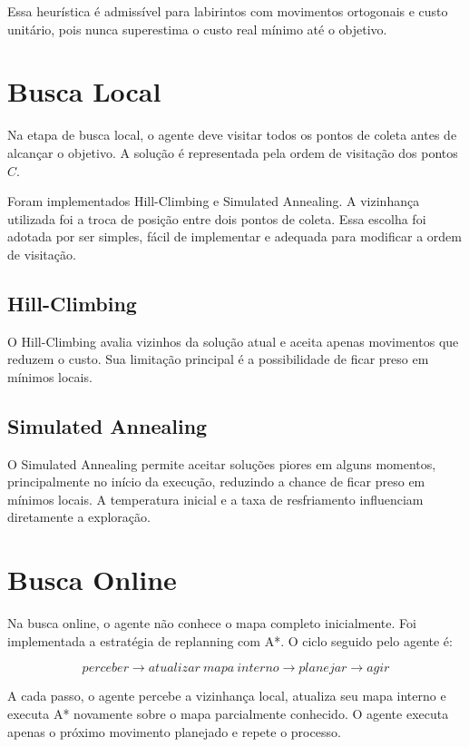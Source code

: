 \documentclass[12pt,a4paper]{article}
\begin{document}
Essa heurística é admissível para labirintos com movimentos ortogonais e custo unitário, pois nunca superestima o custo real mínimo até o objetivo.

\section{Busca Local}

Na etapa de busca local, o agente deve visitar todos os pontos de coleta antes de alcançar o objetivo. A solução é representada pela ordem de visitação dos pontos $C$.

Foram implementados Hill-Climbing e Simulated Annealing. A vizinhança utilizada foi a troca de posição entre dois pontos de coleta. Essa escolha foi adotada por ser simples, fácil de implementar e adequada para modificar a ordem de visitação.

\subsection{Hill-Climbing}

O Hill-Climbing avalia vizinhos da solução atual e aceita apenas movimentos que reduzem o custo. Sua limitação principal é a possibilidade de ficar preso em mínimos locais.

\subsection{Simulated Annealing}

O Simulated Annealing permite aceitar soluções piores em alguns momentos, principalmente no início da execução, reduzindo a chance de ficar preso em mínimos locais. A temperatura inicial e a taxa de resfriamento influenciam diretamente a exploração.

\section{Busca Online}

Na busca online, o agente não conhece o mapa completo inicialmente. Foi implementada a estratégia de replanning com A*. O ciclo seguido pelo agente é:

\[
perceber \rightarrow atualizar \ mapa \ interno \rightarrow planejar \rightarrow agir
\]

A cada passo, o agente percebe a vizinhança local, atualiza seu mapa interno e executa A* novamente sobre o mapa parcialmente conhecido. O agente executa apenas o próximo movimento planejado e repete o processo.
\end{document}
